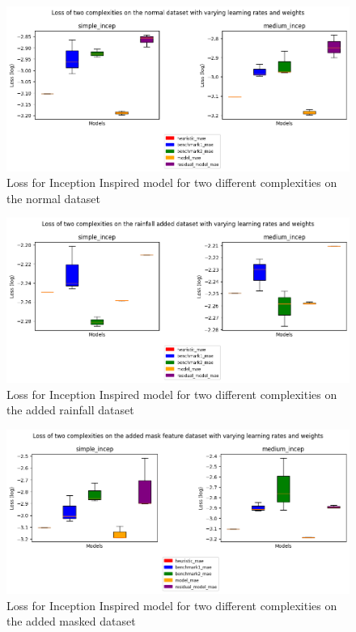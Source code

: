 \begin{figure}[tbph]
	\centering
	\includegraphics[width=0.8\linewidth, height=0.3\textheight]{Figures/Results/Inception_model/normal_dataset}
	\caption[Loss for Inception Inspired model for two different complexities on the normal dataset]{Loss for Inception Inspired model for two different complexities on the normal dataset}
	\label{fig:incep-normaldset}
\end{figure}


\begin{figure}[tbph]
	\centering
	\includegraphics[width=0.8\linewidth, height=0.3\textheight]{Figures/Results/Inception_model/rainfall_dataset}
	\caption[Loss for Inception Inspired model for two different complexities on the added rainfall dataset]{Loss for Inception Inspired model for two different complexities on the added rainfall dataset}
	\label{fig:incep-rfdset}
\end{figure}

\begin{figure}[tbph]
	\centering
	\includegraphics[width=0.8\linewidth, height=0.3\textheight]{Figures/Results/Inception_model/mask_dataset}
	\caption[Loss for Inception Inspired model for two different complexities on the added mask dataset]{Loss for Inception Inspired model for two different complexities on the added masked dataset}
	\label{fig:incep-maskdset}
\end{figure}

